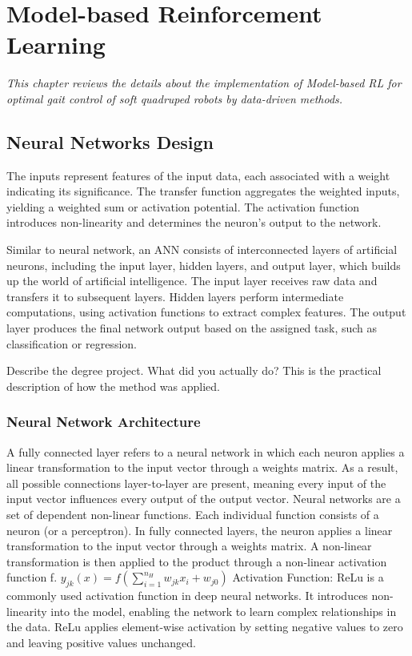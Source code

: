 \chapter{Model-based Reinforcement Learning}
\label{chap4}
\textit{This chapter reviews the details about the implementation of Model-based \ac{RL} for optimal gait control of soft quadruped robots by data-driven methods.}

\section{Neural Networks Design}
The inputs represent features of the input data, each associated with a weight indicating its significance. The transfer function aggregates the weighted inputs, yielding a weighted sum or activation potential. The activation function introduces non-linearity and determines the neuron's output to the network. 

Similar to neural network, an \ac{ANN} consists of interconnected layers of artificial neurons, including the input layer, hidden layers, and output layer, which builds up the world of artificial intelligence. The input layer receives raw data and transfers it to subsequent layers. Hidden layers perform intermediate computations, using activation functions to extract complex features. The output layer produces the final network output based on the assigned task, such as classification or regression. 

Describe the degree project. What did you actually do? This is the practical description of how the method was applied. 
\subsection{Neural Network Architecture}
A fully connected layer refers to a neural network in which each neuron applies a linear transformation to the input vector through a weights matrix. As a result, all possible connections layer-to-layer are present, meaning every input of the input vector influences every output of the output vector. Neural networks are a set of dependent non-linear functions. Each individual function consists of a neuron (or a perceptron). In fully connected layers, the neuron applies a linear transformation to the input vector through a weights matrix. A non-linear transformation is then applied to the product through a non-linear activation function f. $y_{j k}(x)=f\left(\sum_{i=1}^{n_H} w_{j k} x_i+w_{j 0}\right)$
Activation Function: \ac{ReLu} is a commonly used activation function in deep neural networks. It introduces non-linearity into the model, enabling the network to learn complex relationships in the data. \ac{ReLu} applies element-wise activation by setting negative values to zero and leaving positive values unchanged.

